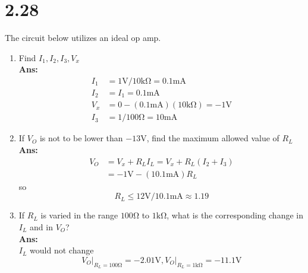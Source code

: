 \documentclass[12pt, a4paper]{article}
\newcommand{\smia}{\si{\milli\ampere}}
\newcommand{\svol}{\si{\volt}}
\newcommand{\sohm}{\si{\ohm}}
\newcommand{\skom}{\si{\kilo\ohm}}
\newcommand{\Ans}{{\\ \bf Ans:} \\}
\begin{document}
\section{2.28}
The circuit below utilizes an ideal op amp.\\
\begin{figure}[H]
\centering
{}
\end{figure}
\begin{enumerate}[label=(\alph*)]
  \item Find $I_1, I_2, I_3, V_x$
    \Ans 
    \begin{align*}
      I_1 &= 1\si{\volt} / 10\si{\kilo\ohm} = 0.1\si{\milli\ampere}\\
      I_2 &= I_1 = 0.1\si{\milli\ampere}\\
      V_x &= 0 - (0.1\si{\milli\ampere})(10\si{\kilo\ohm}) = -1 \si{\volt}\\
      I_3 &= 1 / 100\si{\ohm} = 10\si{\milli\ampere}
    \end{align*}
  \item If $V_O$ is not to be lower than $-13\si{\volt}$, find the maximum allowed value of $R_L$
    \Ans 
    \begin{align*}
      V_O &= V_x + R_L I_L = V_x + R_L (I_2 + I_3)\\
          &= - 1\si{\volt} - (10.1 \smia) R_L
    \end{align*}
    so
    \[
      R_L \leq 12\svol / 10.1 \smia \approx 1.19
    \]
  \item If $R_L$ is varied in the range $100 \sohm$ to $1 \si{\kilo\ohm}$, what is the corresponding change in $I_L$ and in $V_O$?
    \Ans
    $I_L$ would not change\\
    \[
      V_O \rvert_{R_L = 100 \sohm} = -2.01 \svol, V_O \rvert_{R_L = 1\skom} = -11.1\svol
    \]
\end{enumerate}
\end{document}
